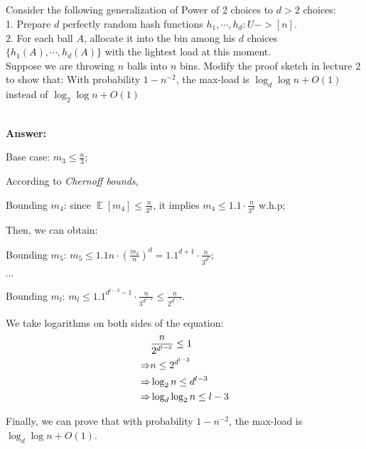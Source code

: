 \documentclass[12pt]{article}
\newcommand{\Answer}{\ \\ \textbf{Answer:} }
\DeclareMathOperator*{\E}{\mathbb{E}}
\begin{document}
~\\
~\\
~\\
~\\
\begin{problem}[20 points]
Consider the following generalization of Power of 2 choices to $d > 2$ choices: \\
1. Prepare $d$ perfectly random hash functions $h_1, \cdots, h_d : U -> [n]$. \\
2. For each ball $A$, allocate it into the bin among his $d$ choices $\{h_1(A), \cdots, h_d(A)\}$ with the lightest load at this moment. \\

Suppose we are throwing $n$ balls into $n$ bins. Modify the proof sketch in lecture 2 to show that: With probability $1 - n^{-2}$, 
the max-load is $\log_d{\log n} + O(1)$ instead of $\log_2{\log n} + O(1)$

\Answer

Base case: $m_3 \le \frac{n}{3}$;

According to \textit{Chernoff bounds},

Bounding $m_4$: since $\E[m_4] \le \frac{n}{3^d}$, it implies $m_4 \le 1.1 \cdot \frac{n}{3^d}$ w.h.p;

Then, we can obtain:

Bounding $m_5$: $m_5 \le 1.1n \cdot (\frac{m_4}{n})^d = 1.1^{d+1} \cdot \frac{n}{3^{d^2}}$;

$\cdots$

Bounding $m_l$: $m_l \le 1.1^{d^{l-3}-1} \cdot \frac{n}{3^{d^{l-3}}} \le \frac{n}{2^{d^{l-3}}}$.

We take logarithms on both sides of the equation:
\begin{equation}
\begin{aligned}
& \frac{n}{2^{d^{l-3}}} \le 1\\ \notag
\Rightarrow & n \le 2^{d^{l-3}} \\
\Rightarrow & \log_2 n \le d^{l-3} \\
\Rightarrow & \log_d{\log_2 n} \le l-3
\end{aligned}
\end{equation}

Finally, we can prove that with probability $1 - n^{-2}$, the max-load is $\log_d{\log n} + O(1)$.
\end{problem}
\end{document}
